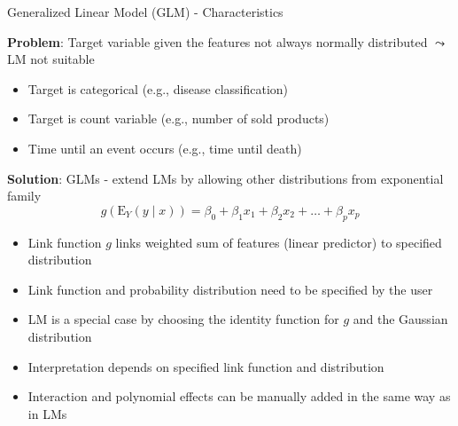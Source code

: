 \documentclass[11pt,compress,t,notes=noshow, aspectratio=169, xcolor=table]{beamer}
\begin{document}
\begin{frame}{Generalized Linear Model (GLM) - Characteristics}

\textbf{Problem}: Target variable given the features not always normally distributed $\leadsto$ LM not suitable
\begin{itemize}
    \item Target is categorical (e.g., disease classification)
    \item Target is count variable (e.g., number of sold products)
    \item Time until an event occurs (e.g., time until death)
\end{itemize}
\medskip
\pause
\textbf{Solution}: GLMs - extend LMs by allowing other distributions from exponential family
$$g(\mathrm{E}_Y (y\mid x)) = \beta_0 + \beta_1 x_1 + \beta_2 x_2 + \ldots + \beta_p x_p$$
\vspace*{-0.4cm}
    \begin{itemize}
        \item Link function $g$ links weighted sum of features (linear predictor) to specified distribution
        \item Link function and probability distribution need to be specified by the user
        \item LM is a special case by choosing the identity function for $g$ and the Gaussian distribution
        \item Interpretation depends on specified link function and distribution
        \item Interaction and polynomial effects can be manually added in the same way as in LMs
    \end{itemize}
    
    
    
    
\end{frame}
 	
\end{document}
